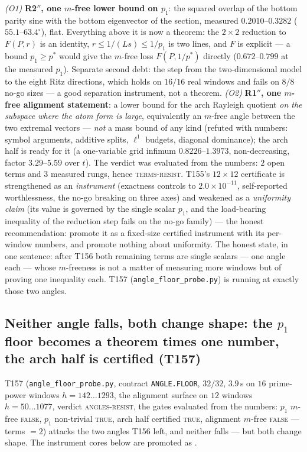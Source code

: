 \documentclass[11pt,a4paper]{article}
\begin{document}
\begin{keybox}
\emph{(O1)} \textbf{R2$''$, one $m$-free lower bound on $p_1$}: the squared overlap of
the bottom parity sine with the bottom eigenvector of the section, measured
$0.2010$--$0.3282$ ($55.1$--$63.4^\circ$), flat. Everything above it is now a theorem: the
$2\times2$ reduction to $F(P,r)$ is an identity, $r\le1/(Ls)\le1/p_1$ is two lines, and
$F$ is explicit --- a bound $p_1\ge p^*$ would give the $m$-free loss $F(P,1/p^*)$
directly ($0.672$--$0.799$ at the measured $p_1$). Separate second debt: the step from
the two-dimensional model to the eight Ritz directions, which holds on $16/16$ real
windows and fails on $8/8$ no-go sizes --- a good separation instrument, not a theorem.
\emph{(O2)} \textbf{R1$''$, one $m$-free alignment statement}: a lower bound for the arch
Rayleigh quotient \emph{on the subspace where the atom form is large}, equivalently an
$m$-free angle between the two extremal vectors --- \emph{not} a mass bound of any kind
(refuted with numbers: symbol arguments, additive splits, $\ell^1$ budgets, diagonal
dominance); the arch half is ready for it (a one-variable grid infimum
$0.8226$--$1.3973$, non-decreasing, factor $3.29$--$5.59$ over $t$). The verdict was
evaluated from the numbers: $2$ open terms and $3$ measured rungs, hence
\textsc{terms-resist}. T155's $12\times12$ certificate is strengthened as an
\emph{instrument} (exactness controls to $2.0\times10^{-11}$, self-reported
worthlessness, the no-go breaking on three axes) and weakened as a \emph{uniformity
claim} (its value is governed by the single scalar $p_1$, and the load-bearing
inequality of the reduction step fails on the no-go family) --- the honest
recommendation: promote it as a fixed-size certified instrument with its per-window
numbers, and promote nothing about uniformity. The honest state, in one sentence: after
T156 both remaining terms are single scalars --- one angle each --- whose $m$-freeness is
not a matter of measuring more windows but of proving one inequality each.
T157 (\texttt{angle\_floor\_probe.py}) is running at exactly those two angles.
\end{keybox}

\subsection{Neither angle falls, both change shape: the $p_1$ floor becomes a theorem
times one number, the arch half is certified (T157)}
T157 (\texttt{angle\_floor\_probe.py}, contract \texttt{ANGLE.FLOOR}, $32/32$,
$3.9$\,s on $16$ prime-power windows $h=142\ldots1293$, the alignment surface on $12$
windows $h=50\ldots1077$, verdict \textsc{angles-resist}, the gates evaluated from the
numbers: $p_1$ $m$-free \textsc{false}, $p_1$ non-trivial \textsc{true}, arch half
certified \textsc{true}, alignment $m$-free \textsc{false} --- terms $=2$) attacks the
two angles T156 left, and neither falls --- but both change shape. The instrument cores
below are promoted as .
\end{document}
